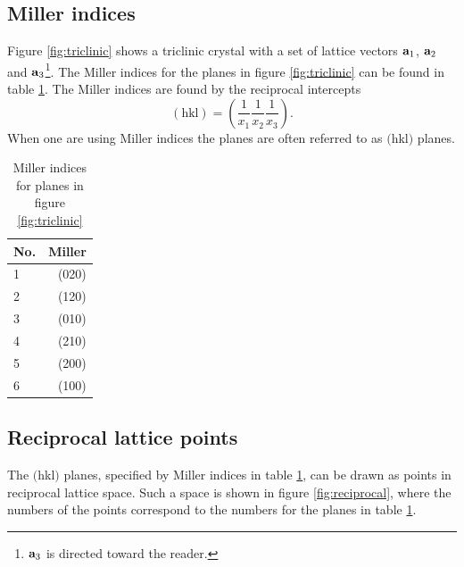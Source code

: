 \documentclass[10pt, a4paper]{amsart}
\begin{document}
\subsection{Miller indices}

Figure \ref{fig:triclinic} shows a triclinic crystal with a set of lattice vectors $\vb{a}_1$, $\vb{a}_2$ and $\vb{a}_3$\footnote{$\vb{a}_3$ is directed toward the reader.}. The Miller indices for the planes in figure \ref{fig:triclinic} can be found in table \ref{tab:miller}. The Miller indices are found by the reciprocal intercepts
\begin{equation}
(\text{hkl}) = \left(\frac{1}{x_1}\frac{1}{x_2}\frac{1}{x_3}\right).
\end{equation}
When one are using Miller indices the planes are often referred to as $($hkl$)$ planes.

\begin{table}
	\centering
	\caption{Miller indices for planes in figure \ref{fig:triclinic}}
	\label{tab:miller}
	\begin{tabular}{lr} 
	No. & Miller \\ \hline
	1 	& (020) \\
	2	& (120) \\
	3 	& (010) \\
	4	& (210) \\
	5	& (200) \\
	6 	& (100) \\ \hline
	\end{tabular}
\end{table}

\subsection{Reciprocal lattice points}

The $($hkl$)$ planes, specified by Miller indices in table \ref{tab:miller}, can be drawn as points in reciprocal lattice space. Such a space is shown in figure \ref{fig:reciprocal}, where the numbers of the points correspond to the numbers for the planes in table \ref{tab:miller}.
\end{document}
